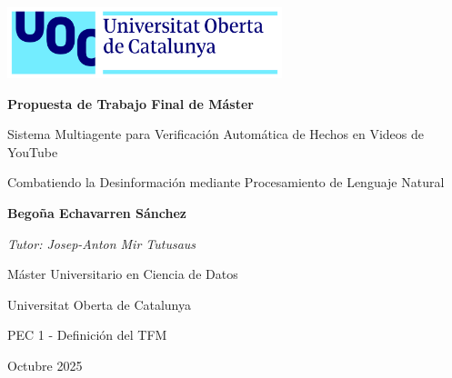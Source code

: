 \begin{titlepage}
    \begin{center}

    \vspace*{0.5cm}

    \includegraphics[width=0.6\textwidth]{figs/uoc_logo.png}

    \vspace{1cm}

    {\Huge \textbf{Propuesta de Trabajo Final de Máster}}

    \vspace{1.5cm}

    {\LARGE Sistema Multiagente para Verificación Automática de Hechos en Videos de YouTube}

    \vspace{0.5cm}

    {\Large Combatiendo la Desinformación mediante Procesamiento de Lenguaje Natural}

    \vspace{2cm}

    \textbf{Begoña Echavarren Sánchez}

    \vspace{0.5cm}

    \textit{Tutor: Josep-Anton Mir Tutusaus}

    \vspace{1.5cm}

    {\large Máster Universitario en Ciencia de Datos}

    {\large Universitat Oberta de Catalunya}

    \vspace{1cm}

    {\large PEC 1 - Definición del TFM}

    \vspace{0.5cm}

    {\large Octubre 2025}

    \end{center}
    \end{titlepage}
